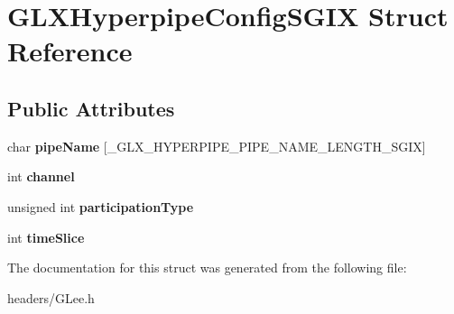 \hypertarget{struct_g_l_x_hyperpipe_config_s_g_i_x}{\section{G\+L\+X\+Hyperpipe\+Config\+S\+G\+I\+X Struct Reference}
\label{struct_g_l_x_hyperpipe_config_s_g_i_x}
}
\subsection*{Public Attributes}
\begin{DoxyCompactItemize}
\item 
\hypertarget{struct_g_l_x_hyperpipe_config_s_g_i_x_a1a7eec9ecdffe7a130bb997928c08459}{char {\bfseries pipe\+Name} \mbox{[}\+\_\+\+G\+L\+X\+\_\+\+H\+Y\+P\+E\+R\+P\+I\+P\+E\+\_\+\+P\+I\+P\+E\+\_\+\+N\+A\+M\+E\+\_\+\+L\+E\+N\+G\+T\+H\+\_\+\+S\+G\+I\+X\mbox{]}}\label{struct_g_l_x_hyperpipe_config_s_g_i_x_a1a7eec9ecdffe7a130bb997928c08459}

\item 
\hypertarget{struct_g_l_x_hyperpipe_config_s_g_i_x_abc812d8796ba89d5de4e33b3532d8335}{int {\bfseries channel}}\label{struct_g_l_x_hyperpipe_config_s_g_i_x_abc812d8796ba89d5de4e33b3532d8335}

\item 
\hypertarget{struct_g_l_x_hyperpipe_config_s_g_i_x_a093cfaaec305531f66e1120929b5b01b}{unsigned int {\bfseries participation\+Type}}\label{struct_g_l_x_hyperpipe_config_s_g_i_x_a093cfaaec305531f66e1120929b5b01b}

\item 
\hypertarget{struct_g_l_x_hyperpipe_config_s_g_i_x_afe9288e75dc1ae5e0f33eff978d7024d}{int {\bfseries time\+Slice}}\label{struct_g_l_x_hyperpipe_config_s_g_i_x_afe9288e75dc1ae5e0f33eff978d7024d}

\end{DoxyCompactItemize}


The documentation for this struct was generated from the following file\+:\begin{DoxyCompactItemize}
\item 
headers/G\+Lee.\+h\end{DoxyCompactItemize}
